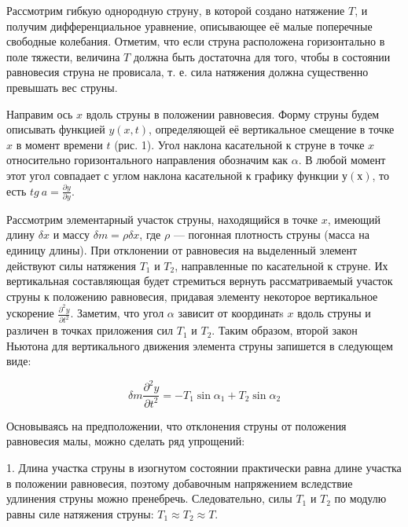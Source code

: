 \documentclass[14pt]{article}
\begin{document}
%
%



Рассмотрим гибкую однородную струну, в которой создано натяжение $T$, и получим дифференциальное уравнение, описывающее её малые поперечные свободные колебания. Отметим, что если струна расположена горизонтально в поле тяжести, величина $T$ должна быть достаточна для того, чтобы в
состоянии равновесия струна не провисала, т. е. сила натяжения должна существенно превышать вес струны.

Направим ось $x$ вдоль струны в положении равновесия. Форму струны будем описывать функцией $y(x, t)$, определяющей её вертикальное смещение в
точке $x$ в момент времени $t$ (рис. 1). Угол наклона касательной к струне в точке $x$ относительно горизонтального направления обозначим как 
$\alpha$. В любой момент этот угол совпадает с углом наклона касательной к графику функции $у(х)$, то есть 
$tg~a = \frac{\partial y}{\partial y}$.

Рассмотрим элементарный участок струны, находящийся в точке $x$, имеющий длину $\delta x$ и массу $\delta m = \rho \delta x$, где $\rho$ --- погонная плотность струны (масса на единицу длины). При отклонении от равновесия на выделенный элемент действуют силы натяжения $T_1$ и $T_2$, направленные по касательной к струне. Их вертикальная составляющая будет стремиться вернуть рассматриваемый участок струны к положению равновесия, придавая элементу некоторое вертикальное ускорение $\frac{\partial^2y}{\partial t^2}$. Заметим, что угол $\alpha$ зависит от координатs $x$ вдоль струны и различен в точках приложения сил $T_1$ и $T_2$. Таким образом, второй закон Ньютона для вертикального движения элемента струны запишется в следующем виде:

\begin{center}
\begin{equation}
\delta m \frac{\partial^2y}{\partial t^2} = -T_1\sin \alpha_1 + T_2\sin \alpha_2
\end{equation}
\end{center}


Основываясь на предположении, что отклонения струны от положения равновесия малы, можно сделать ряд упрощений:

1. Длина участка струны в изогнутом состоянии практически равна длине участка в положении равновесия, поэтому добавочным напряжением вследствие удлинения струны можно пренебречь. Следовательно, силы $T_1$ и $T_2$ по модулю равны силе натяжения струны: $T_1 \approx T_2 \approx T$.
\end{document}
